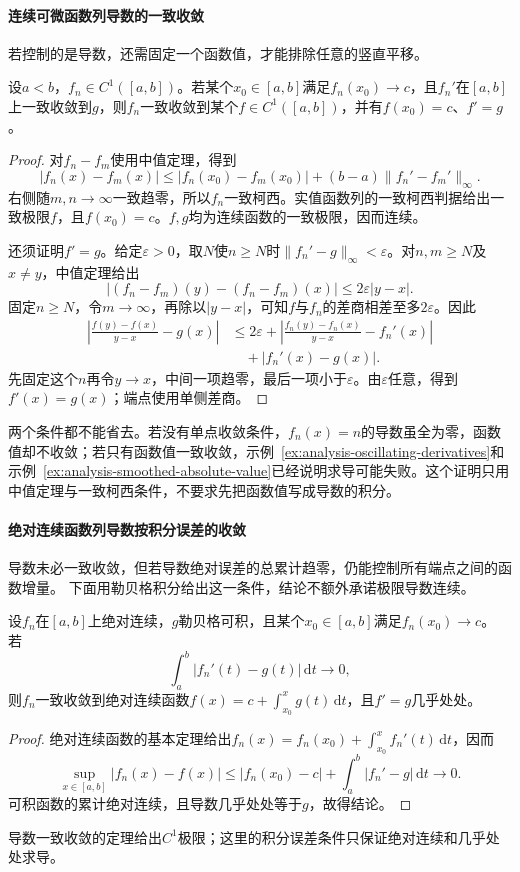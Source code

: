 \paragraph{连续可微函数列导数的一致收敛}
若控制的是导数，还需固定一个函数值，才能排除任意的竖直平移。
\begin{theorem}[一致导数逼近与求导保持]
\label{thm:analysis-uniform-derivative-limit}
设$a<b$，$f_n\in C^1([a,b])$。若某个$x_0\in[a,b]$满足$f_n(x_0)\to c$，且$f_n'$在$[a,b]$上一致收敛到$g$，则$f_n$一致收敛到某个$f\in C^1([a,b])$，并有$f(x_0)=c$、$f'=g$。
\end{theorem}
\begin{proof}
对$f_n-f_m$使用中值定理，得到
\[
 |f_n(x)-f_m(x)|\leq |f_n(x_0)-f_m(x_0)|+(b-a)\lVert f_n'-f_m'\rVert_\infty.
\]
右侧随$m,n\to\infty$一致趋零，所以$f_n$一致柯西。实值函数列的一致柯西判据给出一致极限$f$，且$f(x_0)=c$。$f,g$均为连续函数的一致极限，因而连续。

还须证明$f'=g$。给定$\varepsilon>0$，取$N$使$n\geq N$时$\lVert f_n'-g\rVert_\infty<\varepsilon$。对$n,m\geq N$及$x\neq y$，中值定理给出
\[
 |(f_n-f_m)(y)-(f_n-f_m)(x)|\leq2\varepsilon|y-x|.
\]
固定$n\geq N$，令$m\to\infty$，再除以$|y-x|$，可知$f$与$f_n$的差商相差至多$2\varepsilon$。因此
\[
 \begin{aligned}
 \left|\frac{f(y)-f(x)}{y-x}-g(x)\right|
 &\leq2\varepsilon+
 \left|\frac{f_n(y)-f_n(x)}{y-x}-f_n'(x)\right|\\
 &\quad+|f_n'(x)-g(x)|.
 \end{aligned}
\]
先固定这个$n$再令$y\to x$，中间一项趋零，最后一项小于$\varepsilon$。由$\varepsilon$任意，得到$f'(x)=g(x)$；端点使用单侧差商。
\end{proof}
两个条件都不能省去。若没有单点收敛条件，$f_n(x)=n$的导数虽全为零，函数值却不收敛；若只有函数值一致收敛，示例~\ref{ex:analysis-oscillating-derivatives}和示例~\ref{ex:analysis-smoothed-absolute-value}已经说明求导可能失败。这个证明只用中值定理与一致柯西条件，不要求先把函数值写成导数的积分。

\paragraph{绝对连续函数列导数按积分误差的收敛}
导数未必一致收敛，但若导数绝对误差的总累计趋零，仍能控制所有端点之间的函数增量。
下面用勒贝格积分给出这一条件，结论不额外承诺极限导数连续。
\begin{theorem}[导数积分误差控制的极限]
\label{thm:analysis-integral-derivative-limit}
设$f_n$在$[a,b]$上绝对连续，$g$勒贝格可积，且某个$x_0\in[a,b]$满足$f_n(x_0)\to c$。
若
\[
 \int_a^b|f_n'(t)-g(t)|\,\mathrm dt\longrightarrow0,
\]
则$f_n$一致收敛到绝对连续函数$f(x)=c+\int_{x_0}^xg(t)\,\mathrm dt$，且$f'=g$几乎处处。
\end{theorem}
\begin{proof}
绝对连续函数的基本定理给出$f_n(x)=f_n(x_0)+\int_{x_0}^xf_n'(t)\,\mathrm dt$，因而
\[
 \sup_{x\in[a,b]}|f_n(x)-f(x)|
 \leq|f_n(x_0)-c|+\int_a^b|f_n'-g|\,\mathrm dt\longrightarrow0.
\]
可积函数的累计绝对连续，且导数几乎处处等于$g$，故得结论。
\end{proof}
导数一致收敛的定理给出$C^1$极限；这里的积分误差条件只保证绝对连续和几乎处处求导。

